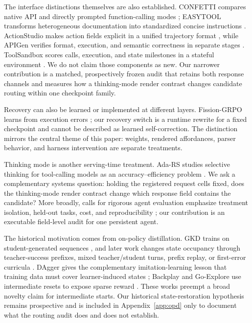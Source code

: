 \documentclass[10pt]{article}
\begin{document}
The interface distinctions themselves are also established. CONFETTI compares
native API and directly prompted function-calling modes
\citep{alkhouli2025confetti}; EASYTOOL transforms heterogeneous documentation
into standardized concise instructions \citep{yuan2025easytool}. ActionStudio
makes action fields explicit in a unified trajectory format
\citep{zhang2025actionstudio}, while APIGen verifies format, execution, and
semantic correctness in separate stages \citep{liu2024apigen}. ToolSandbox
scores calls, execution, and state milestones in a stateful environment
\citep{lu2025toolsandbox}. We do not claim those components as new. Our narrower
contribution is a matched, prospectively frozen audit that retains both response
channels and measures how a thinking-mode render contrast changes candidate
routing within one checkpoint family.

Recovery can also be learned or implemented at different layers.
Fission-GRPO learns from execution errors \citep{zhang2026fission}; our recovery
switch is a runtime rewrite for a fixed checkpoint and cannot be described as
learned self-correction. The distinction mirrors the central theme of this
paper: weights, rendered affordances, parser behavior, and harness intervention
are separate treatments.

Thinking mode is another serving-time treatment. Ada-RS studies selective
thinking for tool-calling models as an accuracy--efficiency problem
\citep{ge2026adars}. We ask a complementary systems question: holding the
registered request cells fixed, does the thinking-mode render contract change
which response field contains the candidate? More broadly, calls for rigorous
agent evaluation emphasize treatment isolation, held-out tasks, cost, and
reproducibility \citep{kapoor2025agents}; our contribution is an executable
field-level audit for one persistent agent.

The historical motivation comes from on-policy distillation. GKD trains on
student-generated sequences \citep{agarwal2024gkd}, and later work changes
state occupancy through teacher-success prefixes, mixed teacher/student turns,
prefix replay, or first-error curricula
\citep{wang2026tcod,li2026guidedopd,liao2026reopd,lyu2025score}. DAgger gives
the complementary imitation-learning lesson that training data must cover
learner-induced states \citep{ross2011dagger}; Backplay and Go-Explore use
intermediate resets to expose sparse reward
\citep{resnick2018backplay,ecoffet2021goexplore}. These works preempt a broad
novelty claim for intermediate starts. Our historical state-restoration
hypothesis remains prospective and is included in Appendix~\ref{app:opd} only
to document what the routing audit does and does not establish.
\end{document}
